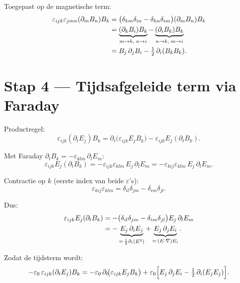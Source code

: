 \documentclass[12pt,a4paper]{article}
\begin{document}
Toegepast op de magnetische term:
\begin{align}
    \varepsilon_{ijk}\varepsilon_{jmn}(\partial_m B_n)B_k
    &= \bigl(\delta_{km}\delta_{in} - \delta_{kn}\delta_{im}\bigr)
       (\partial_m B_n)B_k \notag\\
    &= \underbrace{(\partial_k B_i)B_k}_{m\to k,\;n\to i}
     - \underbrace{(\partial_i B_k)B_k}_{n\to k,\;m\to i} \notag\\
    &= B_j\,\partial_j B_i - \tfrac{1}{2}\,\partial_i(B_k B_k).
\end{align}

\section*{Stap 4 — Tijdsafgeleide term via Faraday}

Productregel:
\begin{equation}
    \varepsilon_{ijk}(\partial_t E_j)B_k
    = \partial_t\!\bigl(\varepsilon_{ijk}E_j B_k\bigr)
    - \varepsilon_{ijk}E_j(\partial_t B_k).
\end{equation}

Met Faraday $\partial_t B_k = -\varepsilon_{klm}\,\partial_l E_m$:
\begin{equation}
    \varepsilon_{ijk}E_j(\partial_t B_k)
    = -\varepsilon_{ijk}\varepsilon_{klm}\,E_j\,\partial_l E_m
    = -\varepsilon_{kij}\varepsilon_{klm}\,E_j\,\partial_l E_m.
\end{equation}

Contractie op $k$ (eerste index van beide $\varepsilon$'s):
\begin{equation}
    \varepsilon_{kij}\varepsilon_{klm} = \delta_{il}\delta_{jm} - \delta_{im}\delta_{jl}.
\end{equation}

Dus:
\begin{align}
    \varepsilon_{ijk}E_j(\partial_t B_k)
    &= -\bigl(\delta_{il}\delta_{jm} - \delta_{im}\delta_{jl}\bigr)E_j\,\partial_l E_m
    \notag\\
    &= -\underbrace{E_j\,\partial_i E_j}_{=\,\frac{1}{2}\partial_i(E^2)}
     + \underbrace{E_j\,\partial_j E_i}_{=\,(E\cdot\nabla)E_i}.
\end{align}

Zodat de tijdsterm wordt:
\begin{equation}
    -\varepsilon_0\,\varepsilon_{ijk}(\partial_t E_j)B_k
    = -\varepsilon_0\,\partial_t\!\bigl(\varepsilon_{ijk}E_j B_k\bigr)
      + \varepsilon_0\Bigl[E_j\,\partial_j E_i - \tfrac{1}{2}\,\partial_i(E_j E_j)\Bigr].
\end{equation}
\end{document}
